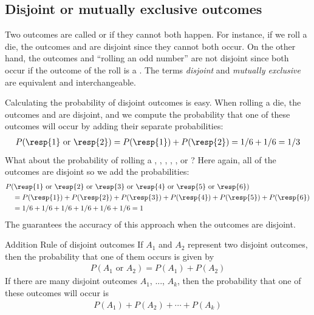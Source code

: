 \subsection{Disjoint or mutually exclusive outcomes}


Two outcomes are called  or  if they cannot both happen. For instance, if we roll a die, the outcomes  and  are disjoint since they cannot both occur. On the other hand, the outcomes  and ``rolling an odd number'' are not disjoint since both occur if the outcome of the roll is a . The terms \emph{disjoint} and \emph{mutually exclusive} are equivalent and interchangeable.

Calculating the probability of disjoint outcomes is easy. When rolling a die, the outcomes  and  are disjoint, and we compute the probability that one of these outcomes will occur by adding their separate probabilities:
\begin{align*}
P(\text{\resp{1} or \resp{2}})
  = P(\text{\resp{1}})+P(\text{\resp{2}})
  = 1/6 + 1/6
  = 1/3
\end{align*}
What about  the probability of rolling a , , , , , or ? Here again, all of the outcomes are disjoint so we add the probabilities:
\begin{align*}
&P(\text{\resp{1} or \resp{2} or \resp{3} or \resp{4}
    or \resp{5} or \resp{6}}) \\
  &\quad = P(\text{\resp{1}})+P(\text{\resp{2}})
      + P(\text{\resp{3}})+P(\text{\resp{4}})
      + P(\text{\resp{5}})+P(\text{\resp{6}}) \\
  &\quad = 1/6 + 1/6 + 1/6 + 1/6 + 1/6 + 1/6
  = 1
\end{align*}
The  guarantees the accuracy of this approach when the outcomes are disjoint. 

\begin{onebox}{Addition Rule of disjoint outcomes}
  If $A_1$ and $A_2$ represent two disjoint outcomes,
  then the probability that one of them occurs is given by
  \begin{align*}
  P(A_1\text{ or } A_2) = P(A_1) + P(A_2)
  \end{align*}
  If there are many disjoint outcomes $A_1$, ..., $A_k$,
  then the probability that one of these outcomes will occur is
  \begin{align*}
  P(A_1) + P(A_2) + \cdots + P(A_k)
  \end{align*}
\end{onebox}

